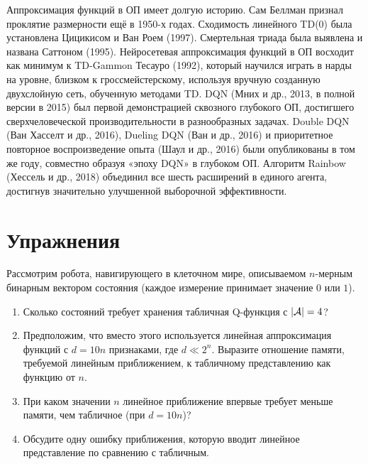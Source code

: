 Аппроксимация функций в ОП имеет долгую историю.  Сам Беллман признал проклятие размерности ещё в 1950-х годах.  Сходимость линейного TD(0) была установлена Цицикисом и Ван Роем (1997).  Смертельная триада была выявлена и названа Саттоном (1995).  Нейросетевая аппроксимация функций в ОП восходит как минимум к TD-Gammon Тесауро (1992), который научился играть в нарды на уровне, близком к гроссмейстерскому, используя вручную созданную двухслойную сеть, обученную методами TD.  DQN (Мних и др., 2013, в полной версии в 2015) был первой демонстрацией сквозного глубокого ОП, достигшего сверхчеловеческой производительности в разнообразных задачах.  Double DQN (Ван Хасселт и др., 2016), Dueling DQN (Ван и др., 2016) и приоритетное повторное воспроизведение опыта (Шаул и др., 2016) были опубликованы в том же году, совместно образуя «эпоху DQN» в глубоком ОП.  Алгоритм Rainbow (Хессель и др., 2018) объединил все шесть расширений в единого агента, достигнув значительно улучшенной выборочной эффективности.

\section*{Упражнения}
\label{sec:exercises-vfa}

\begin{exercise}
\label{ex:curse-dimensionality}
Рассмотрим робота, навигирующего в клеточном мире, описываемом $n$-мерным бинарным вектором состояния (каждое измерение принимает значение $0$ или $1$).
\begin{enumerate}
\item Сколько состояний требует хранения табличная Q-функция с $|\mathcal{A}| = 4$?
\item Предположим, что вместо этого используется линейная аппроксимация функций с $d = 10n$ признаками, где $d \ll 2^n$. Выразите отношение памяти, требуемой линейным приближением, к табличному представлению как функцию от $n$.
\item При каком значении $n$ линейное приближение впервые требует меньше памяти, чем табличное (при $d = 10n$)?
\item Обсудите одну ошибку приближения, которую вводит линейное представление по сравнению с табличным.
\end{enumerate}
\end{exercise}

